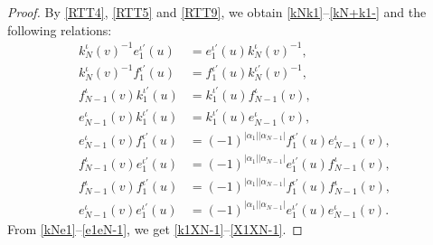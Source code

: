 \documentclass[a4paper,12pt]{article}
\numberwithin{equation}{section}
\begin{document}
\begin{proof}
By \eqref{RTT4}, \eqref{RTT5} and \eqref{RTT9}, we obtain \eqref{kNk1}--\eqref{kN+k1-} and the following relations:
\begin{align}
\label{kNe1}
k_{N}^{\iota}(v)^{-1}e_{1}^{\iota'}(u)&=e_{1}^{\iota'}(u)k_{N}^{\iota}(v)^{-1},\\  \label{kNf1}
k_{N}^{\iota}(v)^{-1}f_{1}^{\iota'}(u)&=f_{1}^{\iota'}(u)k_{N}^{\iota'}(v)^{-1},\\ \label{k1fN-1}
f_{N-1}^{\iota}(v)k_{1}^{\iota'}(u)&=k_{1}^{\iota'}(u)f_{N-1}^{\iota}(v),\\ \label{k1eN-1}
e_{N-1}^{\iota}(v)k_{1}^{\iota'}(u)
&=k_{1}^{\iota'}(u)e_{N-1}^{\iota}(v),\\ \label{eN-1f1}
e_{N-1}^{\iota}(v)
f_{1}^{\iota'}(u)&=(-1)^{|\alpha_{1}||\alpha_{N-1}|}
f_{1}^{\iota'}(u)e_{N-1}^{\iota}(v),\\  \label{e1fN-1}
f_{N-1}^{\iota}(v)e_{1}^{\iota'}(u)&=(-1)^{|\alpha_{1}||\alpha_{N-1}|}
e_{1}^{\iota'}(u)f_{N-1}^{\iota}(v),\\ \label{f1fN-1}
f_{N-1}^{\iota}(v)f_{1}^{\iota'}(u)&=(-1)^{|\alpha_{1}||\alpha_{N-1}|}
f_{1}^{\iota'}(u)f_{N-1}^{\iota}(v),\\ \label{e1eN-1}
e_{N-1}^{\iota}(v)
e_{1}^{\iota'}(u)&=(-1)^{|\alpha_{1}||\alpha_{N-1}|}
e_{1}^{\iota'}(u)e_{N-1}^{\iota}(v).
\end{align}
From \eqref{kNe1}--\eqref{e1eN-1}, we get \eqref{k1XN-1}--\eqref{X1XN-1}.


\end{proof}
\end{document}
